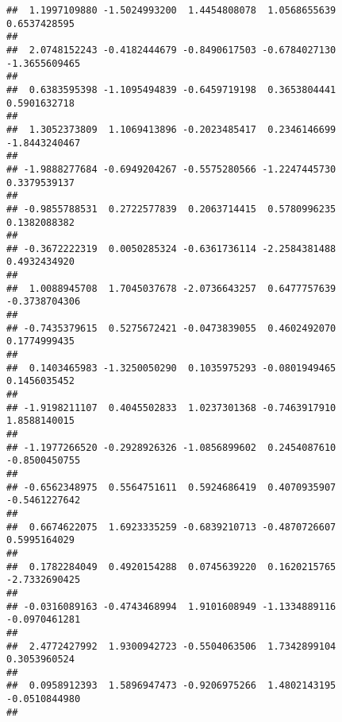\documentclass[]{article}
\begin{document}
\begin{verbatim}
##  1.1997109880 -1.5024993200  1.4454808078  1.0568655639  0.6537428595 
##                                                                       
##  2.0748152243 -0.4182444679 -0.8490617503 -0.6784027130 -1.3655609465 
##                                                                       
##  0.6383595398 -1.1095494839 -0.6459719198  0.3653804441  0.5901632718 
##                                                                       
##  1.3052373809  1.1069413896 -0.2023485417  0.2346146699 -1.8443240467 
##                                                                       
## -1.9888277684 -0.6949204267 -0.5575280566 -1.2247445730  0.3379539137 
##                                                                       
## -0.9855788531  0.2722577839  0.2063714415  0.5780996235  0.1382088382 
##                                                                       
## -0.3672222319  0.0050285324 -0.6361736114 -2.2584381488  0.4932434920 
##                                                                       
##  1.0088945708  1.7045037678 -2.0736643257  0.6477757639 -0.3738704306 
##                                                                       
## -0.7435379615  0.5275672421 -0.0473839055  0.4602492070  0.1774999435 
##                                                                       
##  0.1403465983 -1.3250050290  0.1035975293 -0.0801949465  0.1456035452 
##                                                                       
## -1.9198211107  0.4045502833  1.0237301368 -0.7463917910  1.8588140015 
##                                                                       
## -1.1977266520 -0.2928926326 -1.0856899602  0.2454087610 -0.8500450755 
##                                                                       
## -0.6562348975  0.5564751611  0.5924686419  0.4070935907 -0.5461227642 
##                                                                       
##  0.6674622075  1.6923335259 -0.6839210713 -0.4870726607  0.5995164029 
##                                                                       
##  0.1782284049  0.4920154288  0.0745639220  0.1620215765 -2.7332690425 
##                                                                       
## -0.0316089163 -0.4743468994  1.9101608949 -1.1334889116 -0.0970461281 
##                                                                       
##  2.4772427992  1.9300942723 -0.5504063506  1.7342899104  0.3053960524 
##                                                                       
##  0.0958912393  1.5896947473 -0.9206975266  1.4802143195 -0.0510844980 
##                                                                       

\end{verbatim}
\end{document}
